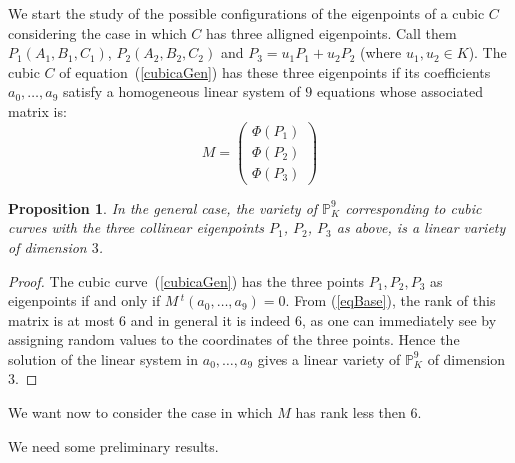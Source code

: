 \documentclass{amsart}
\theoremstyle{plain}
\newtheorem{prop}[theorem]{Proposition}
\theoremstyle{definition}
\begin{document}
We start the study of the possible configurations of the eigenpoints of a
cubic $C$ considering the case in which $C$ has three
alligned eigenpoints. Call them
$P_1(A_1, B_1, C_1)$, $P_2(A_2, B_2, C_2)$ and $P_3 = u_1P_1+u_2P_2$
(where $u_1, u_2 \in K$). The cubic $C$
of equation~(\ref{cubicaGen}) has these three eigenpoints if its coefficients
$a_0, \dots, a_9$ satisfy a homogeneous linear system of $9$
equations whose associated matrix is:
\begin{equation}
M = \left(
\begin{array}{c}
  \Phi(P_1) \\
  \Phi(P_2) \\
  \Phi(P_3)
\end{array}
\right)
\label{matriceM}
\end{equation}
\begin{prop} 
  In the general case, the variety of $\mathbb{P}^9_K$ corresponding to
  cubic curves with the three collinear eigenpoints $P_1$, $P_2$, $P_3$
  as above, is a linear variety of dimension $3$. 
\end{prop}
\begin{proof}
The cubic curve~(\ref{cubicaGen}) has the three
points $P_1, P_2, P_3$ as eigenpoints 
if and only if $M\, {}^t\! (a_0, \dots, a_9) = 0$. {From} (\ref{eqBase}),
the rank of this matrix is at most $6$ and in general it is indeed $6$,
as one can immediately see by assigning random values to the coordinates
of the three points. Hence the solution  of the linear system in
$a_0, \dots, a_9$ gives a linear variety of $\mathbb{P}^9_K$ of dimension
$3$.
\end{proof}

We want now to consider the case in which $M$ has rank less then $6$.

We need some preliminary results.
\end{document}
